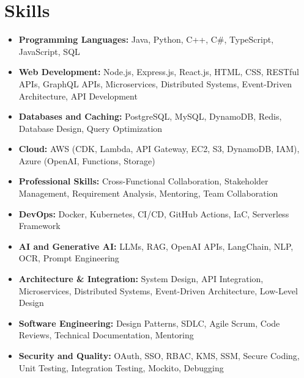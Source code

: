 \documentclass[letterpaper,10pt]{article}
\newcommand{\skillItem}[2]{\item \textbf{#1:} #2}
\begin{document}
\section{Skills}
\begin{minipage}[t]{0.49\textwidth}
\footnotesize
\begin{itemize}[leftmargin=12pt, itemsep=0.4pt, topsep=0.5pt, parsep=0pt]
  \skillItem{Programming Languages}{Java, Python, C++, C\#, TypeScript, JavaScript, SQL}
  \skillItem{Web Development}{Node.js, Express.js, React.js, HTML, CSS, RESTful APIs, GraphQL APIs, Microservices, Distributed Systems, Event-Driven Architecture, API Development}
  \skillItem{Databases and Caching}{PostgreSQL, MySQL, DynamoDB, Redis, Database Design, Query Optimization}
  \skillItem{Cloud}{AWS (CDK, Lambda, API Gateway, EC2, S3, DynamoDB, IAM), Azure (OpenAI, Functions, Storage)}
  \skillItem{Professional Skills}{Cross-Functional Collaboration, Stakeholder Management, Requirement Analysis, Mentoring, Team Collaboration}
\end{itemize}
\end{minipage}
\hfill
\begin{minipage}[t]{0.49\textwidth}
\footnotesize
\begin{itemize}[leftmargin=12pt, itemsep=0.4pt, topsep=0.5pt, parsep=0pt]
  \skillItem{DevOps}{Docker, Kubernetes, CI/CD, GitHub Actions, IaC, Serverless Framework}
  \skillItem{AI and Generative AI}{LLMs, RAG, OpenAI APIs, LangChain, NLP, OCR, Prompt Engineering}
  \skillItem{Architecture \& Integration}{System Design, API Integration, Microservices, Distributed Systems, Event-Driven Architecture, Low-Level Design}
  \skillItem{Software Engineering}{Design Patterns, SDLC, Agile Scrum, Code Reviews, Technical Documentation, Mentoring}
  \skillItem{Security and Quality}{OAuth, SSO, RBAC, KMS, SSM, Secure Coding, Unit Testing, Integration Testing, Mockito, Debugging}
\end{itemize}
\end{minipage}
\vspace{-2pt}
\end{document}
